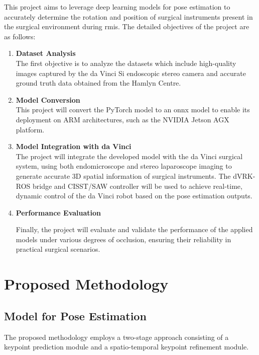 \documentclass[12pt]{article}
\begin{document}
This project aims to leverage deep learning models for pose estimation to accurately determine the rotation and position of surgical instruments present in the surgical environment during \gls{rmis}. The detailed objectives of the project are as follows:

\begin{enumerate}

\item \textbf{Dataset Analysis}
\\The first objective is to analyze the datasets which include high-quality images captured by the da Vinci Si endoscopic stereo camera and accurate ground truth data obtained from the Hamlyn Centre.

\item \textbf{Model Conversion}
\\This project will convert the PyTorch model to an \gls{onnx} model to enable its deployment on ARM architectures, such as the NVIDIA Jetson AGX platform.



\item \textbf{Model Integration with da Vinci}
\\The project will integrate the developed model with the da Vinci surgical system, using both endomicroscope and stereo laparoscope imaging to generate accurate 3D spatial information of surgical instruments. The dVRK-ROS bridge and CISST/SAW controller will be used to achieve real-time, dynamic control of the da Vinci robot based on the pose estimation outputs.

\item \textbf{Performance Evaluation}

Finally, the project will evaluate and validate the performance of the applied models under various degrees of occlusion, ensuring their reliability in practical surgical scenarios.

\end{enumerate}



\section{Proposed Methodology}
\subsection{Model for Pose Estimation}
The proposed methodology employs a two-stage approach consisting of a keypoint prediction module and a spatio-temporal keypoint refinement module\cite{xu2023graph}.
\end{document}
